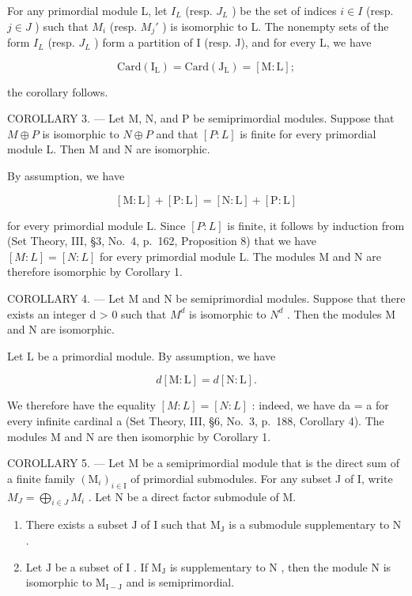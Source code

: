 For any primordial module L, let \(I_{L}\) (resp. \(J_{L}\) ) be the set of indices \(i \in I\) (resp. \(j \in J\) ) such that \(M_{i}\) (resp. \(M_{j}'\) ) is isomorphic to L. The nonempty sets of the form \(I_{L}\) (resp. \(J_{L}\) ) form a partition of I (resp. J), and for every L, we have

\[
\mathrm{Card} (\mathrm {I_ {L}}) = \mathrm{Card} (\mathrm {J_ {L}}) = [ \mathrm{M:L} ];
\]

the corollary follows.

COROLLARY 3. --- Let M, N, and P be semiprimordial modules. Suppose that \(M \oplus P\) is isomorphic to \(N \oplus P\) and that \([P : L]\) is finite for every primordial module L. Then M and N are isomorphic.

By assumption, we have

\[
[ \mathrm{M}: \mathrm{L} ] + [ \mathrm{P}: \mathrm{L} ] = [ \mathrm{N}: \mathrm{L} ] + [ \mathrm{P}: \mathrm{L} ]
\]

for every primordial module L. Since \([P:L]\) is finite, it follows by induction from (Set Theory, III, §3, No.~4, p.~162, Proposition 8) that we have \([M:L]=[N:L]\) for every primordial module L. The modules M and N are therefore isomorphic by Corollary 1.

COROLLARY 4. --- Let M and N be semiprimordial modules. Suppose that there exists an integer d \textgreater{} 0 such that \(M^{d}\) is isomorphic to \(N^{d}\) . Then the modules M and N are isomorphic.

Let \(\mathrm{L}\) be a primordial module. By assumption, we have

\[
d [ \mathrm{M}: \mathrm{L} ] = d [ \mathrm{N}: \mathrm{L} ].
\]

We therefore have the equality \([M:L]=[N:L]\) : indeed, we have da = a for every infinite cardinal a (Set Theory, III, §6, No.~3, p.~188, Corollary 4). The modules M and N are then isomorphic by Corollary 1.

COROLLARY 5. --- Let M be a semiprimordial module that is the direct sum of a finite family \((\mathrm{M}_{i})_{i\in\mathrm{I}}\) of primordial submodules. For any subset J of I, write \(M_{J}=\bigoplus_{i\in J}M_{i}\) . Let N be a direct factor submodule of M.

\begin{enumerate}
\def\labelenumi{\alph{enumi})}
\item
  There exists a subset \(\mathrm{J}\) of \(\mathrm{I}\) such that \(\mathrm{M}_{\mathrm{J}}\) is a submodule supplementary to \(\mathrm{N}\) .
\item
  Let \(\mathrm{J}\) be a subset of \(\mathrm{I}\) . If \(\mathrm{M}_{\mathrm{J}}\) is supplementary to \(\mathrm{N}\) , then the module \(\mathrm{N}\) is isomorphic to \(\mathrm{M}_{\mathrm{I - J}}\) and is semiprimordial.
\end{enumerate}

